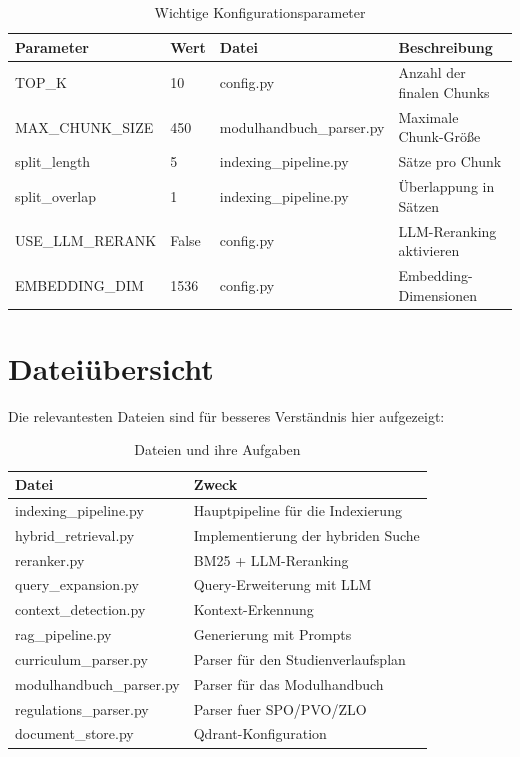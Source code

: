 \begin{table}[htbp]
\centering
\begin{tabular}{|l|l|l|p{5.8cm}|}
\hline
\textbf{Parameter} & \textbf{Wert} & \textbf{Datei} & \textbf{Beschreibung} \\
\hline
TOP\_K & 10 & config.py & Anzahl der finalen Chunks \\
MAX\_CHUNK\_SIZE & 450 & modulhandbuch\_parser.py & Maximale Chunk-Größe \\
split\_length & 5 & indexing\_pipeline.py & Sätze pro Chunk \\
split\_overlap & 1 & indexing\_pipeline.py & Überlappung in Sätzen \\
USE\_LLM\_RERANK & False & config.py & LLM-Reranking aktivieren \\
EMBEDDING\_DIM & 1536 & config.py & Embedding-Dimensionen \\
\hline
\end{tabular}
\caption{Wichtige Konfigurationsparameter}
\label{tab:konfigurationsparameter}
\end{table}

\section{Dateiübersicht}

Die relevantesten Dateien sind für besseres Verständnis hier aufgezeigt:

\begin{table}[htbp]
\centering
\begin{tabular}{|p{5.2cm}|p{8.2cm}|}
\hline
\textbf{Datei} & \textbf{Zweck} \\
\hline
indexing\_pipeline.py & Hauptpipeline für die Indexierung \\
hybrid\_retrieval.py & Implementierung der hybriden Suche \\
reranker.py & BM25 + LLM-Reranking \\
query\_expansion.py & Query-Erweiterung mit LLM \\
context\_detection.py & Kontext-Erkennung \\
rag\_pipeline.py & Generierung mit Prompts \\
curriculum\_parser.py & Parser für den Studienverlaufsplan \\
modulhandbuch\_parser.py & Parser für das Modulhandbuch \\
regulations\_parser.py & Parser fuer SPO/PVO/ZLO \\
document\_store.py & Qdrant-Konfiguration \\
\hline
\end{tabular}
\caption{Dateien und ihre Aufgaben}
\label{tab:dateien_zweck}
\end{table}







